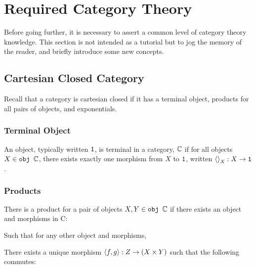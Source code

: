 \documentclass{Report}
\begin{document}
\chapter{Required Category Theory}\label{CategoryTheoryRequirements}


Before going further, it is necessary to assert a common level of category theory knowledge. This section is not intended as a tutorial but to jog the memory of the reader, and briefly introduce some new concepts.

\section{Cartesian Closed Category}\label{CCC}
Recall that a category is cartesian closed if it has a terminal object, products for all pairs of objects, and exponentials.

\subsection{Terminal Object}
An object, typically written $\texttt{1}$, is terminal in a category, $\mathbb{C}$ if for all objects $X\in\texttt{obj }\mathbb{C}$, there exists exactly one morphism from $X$ to $\texttt{1}$, written $\left\langle\right\rangle_{X}: X \rightarrow \texttt{1}$.

\subsection{Products}
There is a product for a pair of objects $X, Y\in\texttt{obj }\mathbb{C}$ if there exists an object and morphisms in C:

Such that for any other object and morphisms,


There exists a unique morphism $\left\langle f, g\right\rangle: Z \rightarrow (X\times Y)$ such that the following commutes:

\end{document}
